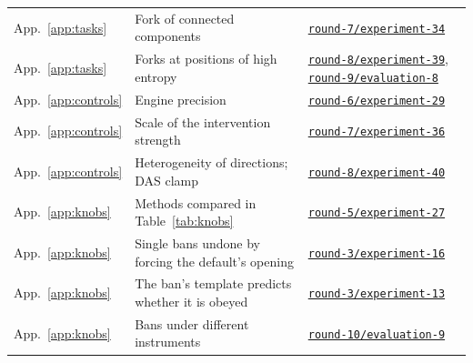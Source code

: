 \documentclass[11pt,letterpaper]{article}
\begin{document}
{\begin{longtable}{@{}L{2.1cm}L{8.9cm}L{4.6cm}@{}}
App.~\ref{app:tasks} & Fork of connected components & \href{https://github.com/ai-inventor-papers/ai-invention-295f8e-prompt-bans-substitute-not-just-subtract/tree/fork/run_jSassd-YWLVC/round-7/experiment-34}{\texttt{round-7/experiment-34}} \\
App.~\ref{app:tasks} & Forks at positions of high entropy & \href{https://github.com/ai-inventor-papers/ai-invention-295f8e-prompt-bans-substitute-not-just-subtract/tree/fork/run_jSassd-YWLVC/round-8/experiment-39}{\texttt{round-8/experiment-39}}, \href{https://github.com/ai-inventor-papers/ai-invention-295f8e-prompt-bans-substitute-not-just-subtract/tree/fork/run_jSassd-YWLVC/round-9/evaluation-8}{\texttt{round-9/evaluation-8}} \\
App.~\ref{app:controls} & Engine precision & \href{https://github.com/ai-inventor-papers/ai-invention-295f8e-prompt-bans-substitute-not-just-subtract/tree/fork/run_jSassd-YWLVC/round-6/experiment-29}{\texttt{round-6/experiment-29}} \\
App.~\ref{app:controls} & Scale of the intervention strength & \href{https://github.com/ai-inventor-papers/ai-invention-295f8e-prompt-bans-substitute-not-just-subtract/tree/fork/run_jSassd-YWLVC/round-7/experiment-36}{\texttt{round-7/experiment-36}} \\
App.~\ref{app:controls} & Heterogeneity of directions; DAS clamp & \href{https://github.com/ai-inventor-papers/ai-invention-295f8e-prompt-bans-substitute-not-just-subtract/tree/fork/run_jSassd-YWLVC/round-8/experiment-40}{\texttt{round-8/experiment-40}} \\
App.~\ref{app:knobs} & Methods compared in Table~\ref{tab:knobs} & \href{https://github.com/ai-inventor-papers/ai-invention-295f8e-prompt-bans-substitute-not-just-subtract/tree/fork/run_jSassd-YWLVC/round-5/experiment-27}{\texttt{round-5/experiment-27}} \\
App.~\ref{app:knobs} & Single bans undone by forcing the default's opening & \href{https://github.com/ai-inventor-papers/ai-invention-295f8e-prompt-bans-substitute-not-just-subtract/tree/fork/run_jSassd-YWLVC/round-3/experiment-16}{\texttt{round-3/experiment-16}} \\
App.~\ref{app:knobs} & The ban's template predicts whether it is obeyed & \href{https://github.com/ai-inventor-papers/ai-invention-295f8e-prompt-bans-substitute-not-just-subtract/tree/fork/run_jSassd-YWLVC/round-3/experiment-13}{\texttt{round-3/experiment-13}} \\
App.~\ref{app:knobs} & Bans under different instruments & \href{https://github.com/ai-inventor-papers/ai-invention-295f8e-prompt-bans-substitute-not-just-subtract/tree/fork/run_jSassd-YWLVC/round-10/evaluation-9}{\texttt{round-10/evaluation-9}} \\

\end{longtable}}
\end{document}
